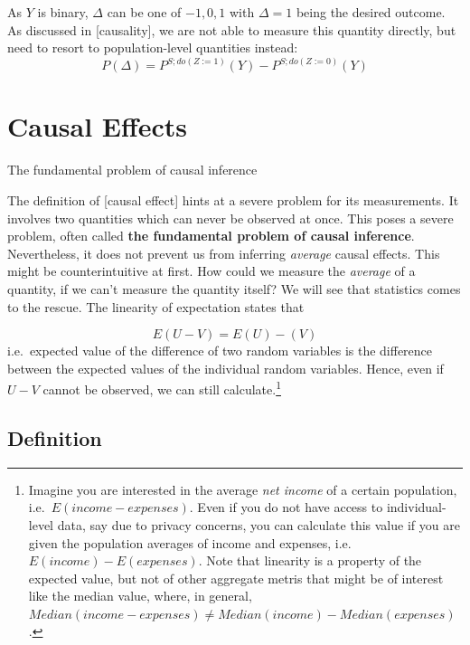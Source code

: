 \documentclass[
]{book}
\theoremstyle{definition}
\theoremstyle{definition}
\theoremstyle{definition}
\theoremstyle{remark}
\begin{document}
As \(Y\) is binary, \(\Delta\) can be one of \({-1, 0, 1}\) with \(\Delta = 1\) being the desired outcome. As discussed in {[}causality{]}, we are not able to measure this quantity directly, but need to resort to population-level quantities instead:
\begin{equation}
P(\Delta) = P^{S;do(Z:=1)}(Y) - P^{S;do(Z:=0)}(Y) \label{eq:mktg_pop_ate} \tag{2}
\end{equation}

\hypertarget{causal-effects}{%
\section{Causal Effects}\label{causal-effects}}

The fundamental problem of causal inference

The definition of {[}causal effect{]} hints at a severe problem for its measurements. It involves two quantities which can never be observed at once. This poses a severe problem, often called \textbf{the fundamental problem of causal inference}.
Nevertheless, it does not prevent us from inferring \emph{average} causal effects. This might be counterintuitive at first. How could we measure the \emph{average} of a quantity, if we can't measure the quantity itself? We will see that statistics comes to the rescue. The linearity of expectation states that

\begin{equation}
E(U - V) = E(U) - (V)
\end{equation}
i.e.~expected value of the difference of two random variables is the difference between the expected values of the individual random variables. Hence, even if \(U - V\) cannot be observed, we can still calculate.\footnote{Imagine you are interested in the average \emph{net income} of a certain population, i.e.~\(E(income - expenses)\). Even if you do not have access to individual-level data, say due to privacy concerns, you can calculate this value if you are given the population averages of income and expenses, i.e.~\(E(income) - E(expenses)\). Note that linearity is a property of the expected value, but not of other aggregate metris that might be of interest like the median value, where, in general, \(Median(income - expenses) \neq Median(income) - Median(expenses)\).}

\hypertarget{definition}{%
\subsection{Definition}\label{definition}}
\end{document}
